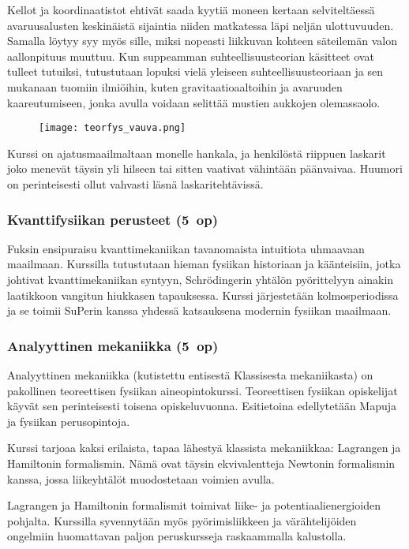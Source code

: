 \documentclass[../ala_hataile.tex]{subfiles}
\begin{document}
	Kellot ja koordinaatistot ehtivät saada
	kyytiä moneen kertaan selviteltäessä
	avaruusalusten keskinäistä sijaintia niiden
	matkatessa läpi neljän ulottuvuuden. Samalla
	löytyy syy myös sille, miksi nopeasti
	liikkuvan kohteen säteilemän valon aallon\-pituus
	muuttuu. Kun suppeamman suhteellisuus\-teorian
	käsitteet ovat tulleet tutuiksi,
	tutustutaan lopuksi vielä yleiseen suhteellisuusteoriaan
	ja sen mukanaan tuomiin ilmiöihin,
	kuten gravitaatio\-aaltoihin ja avaruuden
	kaareutumiseen, jonka avulla voidaan
	selittää mustien aukkojen olemassaolo.
	
	\begin{figure}[]
		\texttt{[image: teorfys\_vauva.png]}
	\end{figure}
	
	Kurssi on ajatus\-maailmaltaan monelle
	hankala, ja henkilöstä riippuen laskarit joko
	menevät täysin yli hilseen tai sitten vaativat
	vähintään pään\-vaivaa. Huumori on perinteisesti
	ollut vahvasti läsnä laskari\-tehtävissä.
	
	\subsubsection*{Kvanttifysiikan perusteet (5~op)}
	Fuksin ensipuraisu kvantti\-mekaniikan
	tavanomaista intuitiota uhmaavaan maailmaan.
	Kurssilla tutustutaan hieman fysiikan
	historiaan ja käänteisiin, jotka johtivat
	kvantti\-mekaniikan syntyyn, Schrödingerin
	yhtälön pyörittelyyn ainakin laatikkoon
	vangitun hiukkasen tapauksessa. Kurssi järjestetään
	kolmosperiodissa ja se toimii SuPerin
	kanssa yhdessä katsauksena modernin
	fysiikan maailmaan. 
	
	\subsubsection*{Analyyttinen mekaniikka (5~op)}
	Analyyttinen mekaniikka (kutistettu entisestä
	Klassisesta mekaniikasta) on pakollinen
	teoreettisen fysiikan aine\-opinto\-kurssi.
	Teoreettisen fysiikan opiskelijat käyvät sen perinteisesti
	toisena opiskelu\-vuonna. Esitietoina edellytetään
	Mapuja ja fysiikan perus\-opintoja.
	
	Kurssi tarjoaa kaksi erilaista, tapaa lähestyä
	klassista mekaniikkaa: Lagrangen ja Hamiltonin formalismin.
	Nämä ovat täysin ekvivalentteja Newtonin
	formalismin kanssa, jossa liike\-yhtälöt muodostetaan
	voimien avulla.
	
	Lagrangen ja Hamiltonin formalismit
	toimivat liike- ja potentiaali\-energioiden
	pohjalta. Kurssilla syvennytään myös pyörimis\-liikkeen
	ja värähtelijöiden ongelmiin
	huomattavan paljon peruskursseja raskaammalla
	kalustolla.
	
\end{document}
